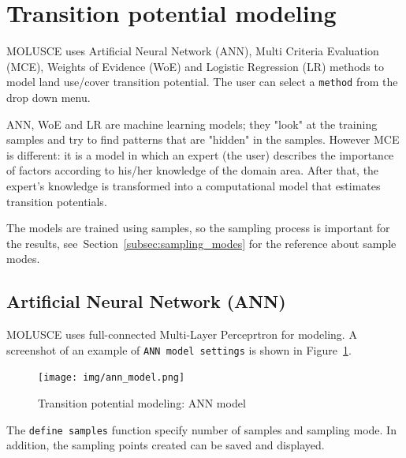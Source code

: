 \documentclass{report}
\begin{document}
\section{Transition potential modeling}
MOLUSCE uses Artificial Neural Network (ANN), Multi Criteria Evaluation (MCE), Weights of
Evidence (WoE) and Logistic Regression (LR) methods to model land use/cover transition
potential. The user can select a \verb+method+ from the drop down menu.


ANN, WoE and LR are machine learning models; they "look" at the training samples and try 
to find patterns that are "hidden" in the samples. However MCE is different: 
it is a model in which an expert (the user) describes the importance of factors
according to his/her knowledge of the domain area. After that, the expert's knowledge is transformed into
a computational model that estimates transition potentials.

The models are trained using samples, so the sampling process is important for the results, see~Section~\ref{subsec:sampling_modes} for the reference about sample modes.


\subsection{Artificial Neural Network (ANN)}
MOLUSCE uses full-connected Multi-Layer Perceprtron for modeling.
A screenshot of an example of \verb+ANN model settings+ is shown in Figure~\ref{fig:ann_model}.

\begin{figure}[h!]
\centering
\texttt{[image: img/ann\_model.png]}
\caption{Transition potential modeling: ANN model}
\label{fig:ann_model}
\end{figure}

The \verb+define samples+ function specify number of samples and sampling mode. In addition, the
sampling points created can be saved and displayed.
\end{document}
